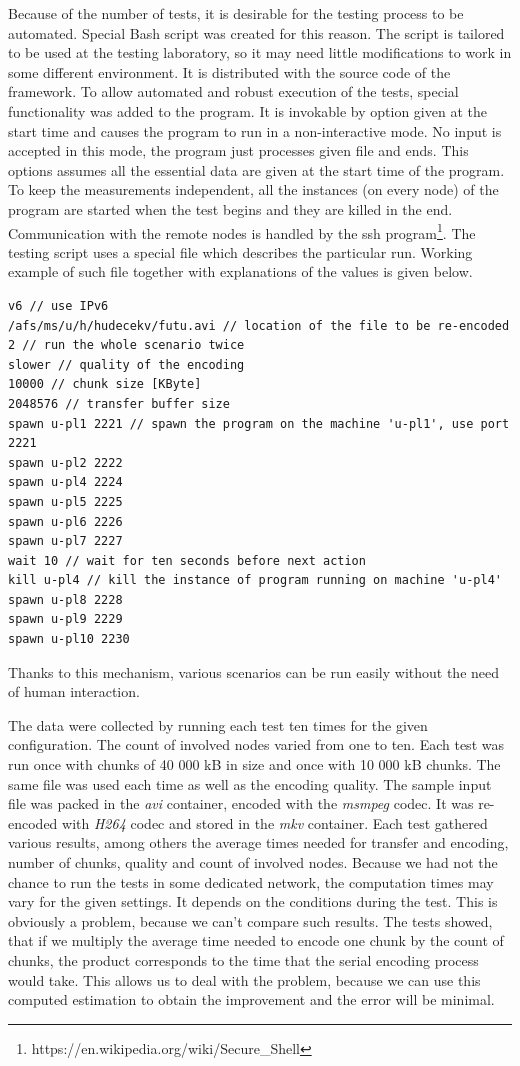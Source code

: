 Because of the number of tests, it is desirable for the testing process
to be automated. Special Bash script was created for this reason. The
script is tailored to be used at the testing laboratory, so it may need
little modifications to work in some different environment. It is
distributed with the source code of the framework. To allow automated
and robust execution of the tests, special functionality was added to
the program. It is invokable by option given at the start time and
causes the program to run in a non-interactive mode. No input is
accepted in this mode, the program just processes given file and ends.
This options assumes all the essential data are given at the start time
of the program. To keep the measurements independent, all the instances
(on every node) of the program are started when the test begins and they
are killed in the end. Communication with the remote nodes is handled by
the ssh program\footnote{https://en.wikipedia.org/wiki/Secure\_Shell}.
The testing script uses a special file which describes the particular
run. Working example of such file together with explanations of the
values is given below.

\begin{samepage}
\begin{verbatim}
v6 // use IPv6
/afs/ms/u/h/hudecekv/futu.avi // location of the file to be re-encoded
2 // run the whole scenario twice
slower // quality of the encoding
10000 // chunk size [KByte]
2048576 // transfer buffer size
spawn u-pl1 2221 // spawn the program on the machine 'u-pl1', use port 2221
spawn u-pl2 2222
spawn u-pl4 2224
spawn u-pl5 2225
spawn u-pl6 2226
spawn u-pl7 2227
wait 10 // wait for ten seconds before next action
kill u-pl4 // kill the instance of program running on machine 'u-pl4'
spawn u-pl8 2228
spawn u-pl9 2229
spawn u-pl10 2230
\end{verbatim}
\end{samepage}

Thanks to this mechanism, various scenarios can be run easily without
the need of human interaction.

The data were collected by running each test ten times for the given
configuration. The count of involved nodes varied from one to ten. Each
test was run once with chunks of 40 000 kB in size and once with 10 000
kB chunks. The same file was used each time as well as the encoding
quality. The sample input file was packed in the \textit{avi} container,
encoded with the \textit{msmpeg} codec. It was re-encoded with
\textit{H264} codec and stored in the \textit{mkv} container. Each test
gathered various results, among others the average times needed for
transfer and encoding, number of chunks, quality and count of involved
nodes. Because we had not the chance to run the tests in some dedicated
network, the computation times may vary for the given settings. It
depends on the conditions during the test. This is obviously a problem,
because we can't compare such results. The tests showed, that if we
multiply the average time needed to encode one chunk by the count of
chunks, the product corresponds to the time that the serial encoding
process would take. This allows us to deal with the problem, because we
can use this computed estimation to obtain the improvement and the error
will be minimal.

